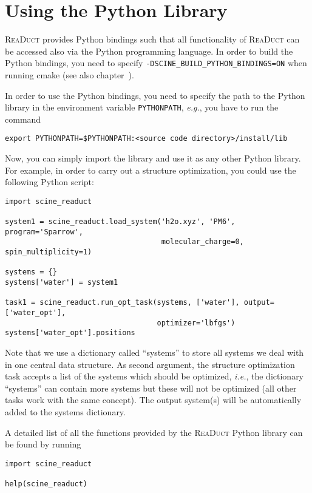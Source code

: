\documentclass[]{tufte-book}
\begin{document}
\chapter{Using the Python Library}

\textsc{ReaDuct} provides Python bindings such that all functionality of \textsc{ReaDuct} can be accessed also via the
Python programming language. In order to build the Python bindings, you need to specify \texttt{-DSCINE\_BUILD\_PYTHON\_BINDINGS=ON}
when running cmake (see also chapter~).

In order to use the Python bindings, you need to specify the path to the Python library in the environment variable
\texttt{PYTHONPATH}, \textit{e.g.}, you have to run the command
\begin{verbatim}
export PYTHONPATH=$PYTHONPATH:<source code directory>/install/lib
\end{verbatim}
Now, you can simply import the library and use it as any other Python library. For example, in order to carry out a 
structure optimization, you could use the following Python script:
\begin{verbatim}
import scine_readuct

system1 = scine_readuct.load_system('h2o.xyz', 'PM6', program='Sparrow', 
                                    molecular_charge=0, spin_multiplicity=1)

systems = {}
systems['water'] = system1

task1 = scine_readuct.run_opt_task(systems, ['water'], output=['water_opt'], 
                                   optimizer='lbfgs')
systems['water_opt'].positions
\end{verbatim}
Note that we use a dictionary called ``systems'' to store all systems we deal with in one central data
structure. As second argument, the structure optimization task accepts a list of the systems which should be optimized,
\textit{i.e.}, the dictionary ``systems'' can contain more systems but these will not be optimized (all other tasks
work with the same concept). The output system(s) will be automatically added to the systems dictionary.

A detailed list of all the functions provided by the \textsc{ReaDuct} Python library can be found by running
\begin{verbatim}
import scine_readuct

help(scine_readuct)
\end{verbatim}
\end{document}
